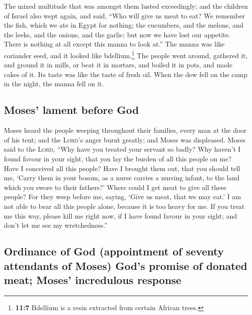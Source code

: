  The mixed multitude that was amongst them lusted
exceedingly; and the children of Israel also wept again, and said, ``Who
will give us meat to eat?  We remember the fish, which we
ate in Egypt for nothing; the cucumbers, and the melons, and the leeks,
and the onions, and the garlic;  but now we have lost our
appetite. There is nothing at all except this manna to look at.''
 The manna was like coriander seed, and it looked like
bdellium.\footnote{\textbf{11:7} Bdellium is a resin extracted from
  certain African trees.}  The people went around,
gathered it, and ground it in mills, or beat it in mortars, and boiled
it in pots, and made cakes of it. Its taste was like the taste of fresh
oil.  When the dew fell on the camp in the night, the
manna fell on it.

\hypertarget{moses-lament-before-god}{%
\subsection{Moses' lament before God}\label{moses-lament-before-god}}

 Moses heard the people weeping throughout their
families, every man at the door of his tent; and the \textsc{Lord}'s
anger burnt greatly; and Moses was displeased.  Moses
said to the \textsc{Lord}, ``Why have you treated your servant so badly?
Why haven't I found favour in your sight, that you lay the burden of all
this people on me?  Have I conceived all this people?
Have I brought them out, that you should tell me, `Carry them in your
bosom, as a nurse carries a nursing infant, to the land which you swore
to their fathers?'  Where could I get meat to give all
these people? For they weep before me, saying, `Give us meat, that we
may eat.'  I am not able to bear all this people alone,
because it is too heavy for me.  If you treat me this
way, please kill me right now, if I have found favour in your sight; and
don't let me see my wretchedness.''

\hypertarget{ordinance-of-god-appointment-of-seventy-attendants-of-moses-gods-promise-of-donated-meat-moses-incredulous-response}{%
\subsection{Ordinance of God (appointment of seventy attendants of
Moses) God's promise of donated meat; Moses' incredulous
response}\label{ordinance-of-god-appointment-of-seventy-attendants-of-moses-gods-promise-of-donated-meat-moses-incredulous-response}}

